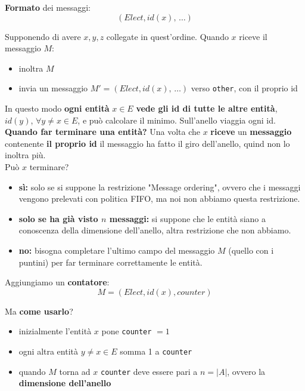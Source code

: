 \textbf{Formato} dei messaggi: 
$$(Elect, id(x), \, \dots)$$

Supponendo di avere $x,y,z$ collegate in quest'ordine. Quando $x$ riceve il messaggio $M$:
\begin{itemize}
	\item inoltra $M$ 
	\item invia un messaggio $M' = (Elect, id(x), \, \dots)$ verso \texttt{other}, con il proprio id
\end{itemize}

In questo modo \textbf{ogni entità} $x \in E$ \textbf{vede gli id di tutte le altre entità}, $id(y)$, $\forall y \neq x \in E$, e può calcolare il minimo. Sull'anello viaggia ogni id.\\

\textbf{Quando far terminare una entità?} Una volta che $x$ \textbf{riceve} un \textbf{messaggio} contenente \textbf{il proprio id} il messaggio ha fatto il giro dell'anello, quind non lo inoltra più.\\

Può $x$ terminare? 
\begin{itemize}
	\item \textbf{sì:} solo se si suppone la restrizione "Message ordering", ovvero che i messaggi vengono prelevati con politica FIFO, ma noi non abbiamo questa restrizione.\\
	
	\item \textbf{solo se ha già visto $n$ messaggi:} si suppone che le entità siano a conoscenza della dimensione dell'anello, altra restrizione che non abbiamo.\\
	
	\item \textbf{no:} bisogna completare l'ultimo campo del messaggio $M$ (quello con i puntini) per far terminare correttamente le entità.\\
\end{itemize}

\newpage

Aggiungiamo un \textbf{contatore}: 
$$ M = (Elect, id(x), counter) $$

Ma \textbf{come usarlo}? 
\begin{itemize}
	\item inizialmente l'entità $x$ pone \texttt{counter} $=1$
	\item ogni altra entità $y \neq x \in E$ somma 1 a \texttt{counter}
	\item quando $M$ torna ad $x$ \texttt{counter} deve essere pari a $n = |A|$, ovvero la \textbf{dimensione dell'anello}
\end{itemize}


